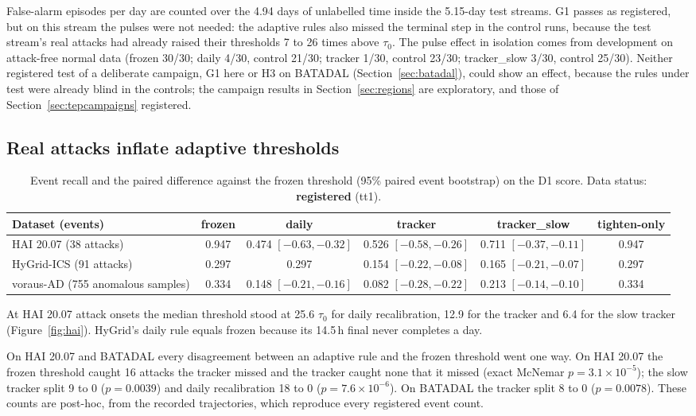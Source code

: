 \documentclass[sigconf,review,anonymous]{acmart}
\begin{document}
False-alarm episodes per day are counted over the 4.94 days of unlabelled time inside the 5.15-day
test streams. G1 passes as registered, but on this stream the pulses were not needed: the adaptive
rules also missed the terminal step in the control runs, because the test stream's real attacks had
already raised their thresholds 7 to 26 times above $\tau_0$. The pulse effect in isolation comes
from development on attack-free normal data (frozen 30/30; daily 4/30, control 21/30; tracker 1/30,
control 23/30; tracker\_slow 3/30, control 25/30). Neither registered test of a deliberate campaign, G1
here or H3 on BATADAL (Section~\ref{sec:batadal}), could show an effect, because the rules under test
were already blind in the controls; the campaign results in Section~\ref{sec:regions} are exploratory, and those of
Section~\ref{sec:tepcampaigns} registered.

\subsection{Real attacks inflate adaptive thresholds}
\label{sec:inflate}

\begin{table}[t]
\caption{Event recall and the paired difference against the frozen threshold (95\% paired event
bootstrap) on the D1 score. Data status: \textbf{registered} (tt1).}
\label{tab:recall}
\begin{tabularx}{\textwidth}{@{}Lccccc@{}}
\toprule
Dataset (events) & frozen & daily & tracker & tracker\_slow & tighten-only \\
\midrule
HAI 20.07 (38 attacks) & 0.947 & 0.474 $[-0.63, -0.32]$ & 0.526 $[-0.58, -0.26]$ & 0.711 $[-0.37, -0.11]$ & 0.947 \\
HyGrid-ICS (91 attacks) & 0.297 & 0.297 & 0.154 $[-0.22, -0.08]$ & 0.165 $[-0.21, -0.07]$ & 0.297 \\
voraus-AD (755 anomalous samples) & 0.334 & 0.148 $[-0.21, -0.16]$ & 0.082 $[-0.28, -0.22]$ & 0.213 $[-0.14, -0.10]$ & 0.334 \\
\bottomrule
\end{tabularx}
\end{table}

At HAI 20.07 attack onsets the median threshold stood at 25.6 $\tau_0$ for daily recalibration, 12.9
for the tracker and 6.4 for the slow tracker (Figure~\ref{fig:hai}). HyGrid's daily rule equals frozen because its 14.5\,h
final never completes a day.

On HAI 20.07 and BATADAL every disagreement between an adaptive rule and the frozen threshold went one way. On HAI 20.07 the
frozen threshold caught 16 attacks the tracker missed and the tracker caught none that it missed
(exact McNemar $p = 3.1 \times 10^{-5}$); the slow tracker split 9 to 0 ($p = 0.0039$) and daily
recalibration 18 to 0 ($p = 7.6 \times 10^{-6}$). On BATADAL the tracker split 8 to 0 ($p = 0.0078$).
These counts are post-hoc, from the recorded trajectories, which reproduce every registered event
count.
\end{document}
